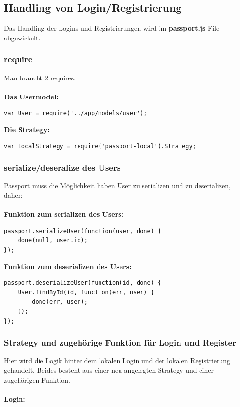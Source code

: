 \subsection{Handling von Login/Registrierung}

Das Handling der Logins und Registrierungen wird im \textbf{passport.js}-File abgewickelt. 

\clearpage

\subsubsection{require}

Man braucht 2 requires:\\\\
\textbf{Das Usermodel:}
\begin{lstlisting}
var User = require('../app/models/user');
\end{lstlisting}
\textbf{Die Strategy:}
\begin{lstlisting}
var LocalStrategy = require('passport-local').Strategy;
\end{lstlisting}

\subsubsection{serialize/deseralize des Users}
Passport muss die Möglichkeit haben User zu serializen und zu deserializen, daher:\\\\
\textbf{Funktion zum serializen des Users:}
\begin{lstlisting}
passport.serializeUser(function(user, done) {
	done(null, user.id);
});
\end{lstlisting}

\textbf{Funktion zum deserializen des Users:}
\begin{lstlisting}
passport.deserializeUser(function(id, done) {
	User.findById(id, function(err, user) {
		done(err, user);
	});
});
\end{lstlisting}

\subsubsection{Strategy und zugehörige Funktion für Login und Register}
Hier wird die Logik hinter dem lokalen Login und der lokalen Registrierung gehandelt.
Beides besteht aus einer neu angelegten Strategy und einer zugehörigen Funktion.\\\\
\textbf{Login:}\\

